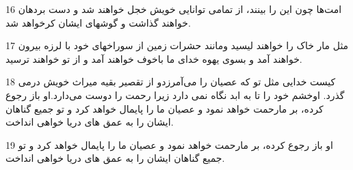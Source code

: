 \par 16 امت‌ها چون این را بینند، از تمامی توانایی خویش خجل خواهند شد و دست بردهان خواهند گذاشت و گوشهای ایشان کرخواهد شد.
\par 17 مثل مار خاک را خواهند لیسید ومانند حشرات زمین از سوراخهای خود با لرزه بیرون خواهند آمد و بسوی یهوه خدای ما باخوف خواهند آمد و از تو خواهند ترسید.
\par 18 کیست خدایی مثل تو که عصیان را می‌آمرزدو از تقصیر بقیه میراث خویش درمی گذرد. اوخشم خود را تا به ابد نگاه نمی دارد زیرا رحمت را دوست می‌دارد.او باز رجوع کرده، بر مارحمت خواهد نمود و عصیان ما را پایمال خواهد کرد و تو جمیع گناهان ایشان را به عمق های دریا خواهی انداخت.
\par 19 او باز رجوع کرده، بر مارحمت خواهد نمود و عصیان ما را پایمال خواهد کرد و تو جمیع گناهان ایشان را به عمق های دریا خواهی انداخت.



